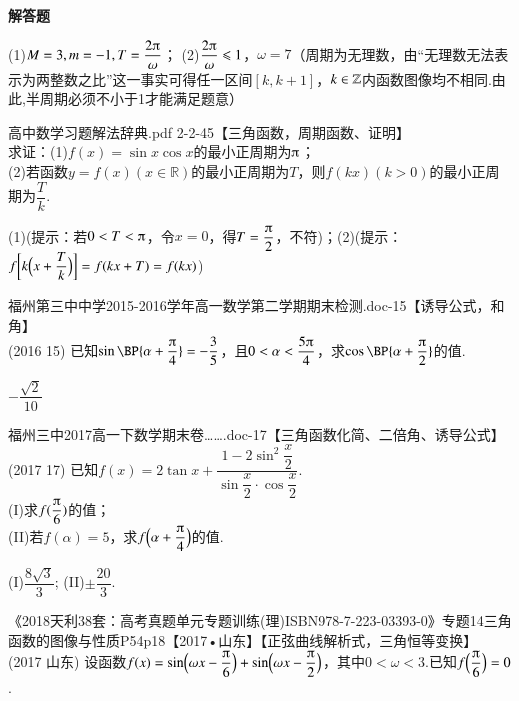 \begin{exercise}{\bf 解答题}
      \begin{answer}
        (1)$M=3,m=-1,T=\dfrac{2\piup}{\omega}$；
        (2)$\dfrac{2\piup}{\omega}\leqslant 1$，$\omega=7$（周期为无理数，由“无理数无法表示为两整数之比”这一事实可得任一区间$[k,k+1]$，$k\in\mathbb{Z}$内函数图像均不相同.由此,半周期必须不小于1才能满足题意）
      \end{answer}
    \item 高中数学习题解法辞典.pdf 2-2-45【三角函数，周期函数、证明】\\
      求证：(1)$f(x)=\sin x\cos x$的最小正周期为$\piup$；\\
      (2)若函数$y=f(x)(x\in\mathbb{R})$的最小正周期为$T$，则$f(kx)(k>0)$的最小正周期为$\dfrac{T}k$.
      \begin{answer}
        (1)(提示：若$0<T<\piup$，令$x=0$，得$T=\dfrac{\piup}2$，不符)；(2)(提示：$f\biggl[k\Bigl(x+\dfrac{T}k\Bigr)\biggr]=f(kx+T)=f(kx)$)
      \end{answer}
    \item 福州第三中中学2015-2016学年高一数学第二学期期末检测.doc-15【诱导公式，和角】\\
      (2016  15)
      已知$\sin\BP{\alpha+\dfrac{\piup}4}=-\dfrac35$，且$0<\alpha<\dfrac{5\piup}4$，求$\cos\BP{\alpha+\dfrac{\piup}2}$的值.
      \begin{answer}
        $-\dfrac{\sqrt2}{10}$
      \end{answer}
    \item 福州三中2017高一下数学期末卷…….doc-17【三角函数化简、二倍角、诱导公式】\\
        (2017  17)
        已知$f(x)=2\tan x+\dfrac{1-2\sin^2{\dfrac{x}2}}{\sin\dfrac{x}2\cdot\cos\dfrac{x}2}$.\\
        (I)求$f(\dfrac{\piup}6)$的值；\\
        (II)若$f(\alpha)=5$，求$f\Bp{\alpha+\dfrac{\piup}4}$的值.
        \begin{answer}
          (I)$\dfrac{8\sqrt3}3$;
          (II)$\pm\dfrac{20}3$.
        \end{answer}
    \item 《2018天利38套：高考真题单元专题训练(理)ISBN978-7-223-03393-0》专题14三角函数的图像与性质P54p18【2017•山东】【正弦曲线解析式，三角恒等变换】\\
          {\kaishu (2017 \textbullet 山东)}
          设函数$f(x)=\sin\Bp{\omega x-\dfrac{\piup}6}+\sin\Bp{\omega x-\dfrac{\piup}2}$，其中$0<\omega<3$.已知$f\Bp{\dfrac{\piup}6}=0$.\\

\end{exercise}
